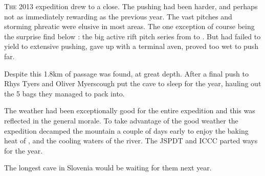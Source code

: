 \thispagestyle{endchapter}

\begin{tcolorbox}

\vspace{80pt}
	\lettrine{T}{he} 2013 expedition drew to a close. The pushing had been harder, 
	and perhaps not as immediately rewarding as the previous year. The vast pitches and storming phreatic were 
	elusive in most areas. The one exception of course being the surprise find below : the big
	active rift pitch series from  to . But  had 
	failed to yield to extensive pushing,  gave up with a terminal aven, 
	proved too wet to push far. 
	
	Despite this 1.8km of passage was found, at great depth. After a final push to  
	Rhys Tyers and Oliver Myerscough put the cave to sleep for the year, hauling out the 5 bags they managed to 
	pack  into.
	
	The weather had been exceptionally good for the entire expedition and this was reflected in the general morale. 
	To take advantage of the good weather the expedition decamped the mountain a couple of days early to enjoy the 
	baking heat of , and the cooling waters of the  river. The JSPDT and ICCC parted ways for the year.

	The longest cave in Slovenia would be waiting for them next year.

\end{tcolorbox} 
\BgThispage
